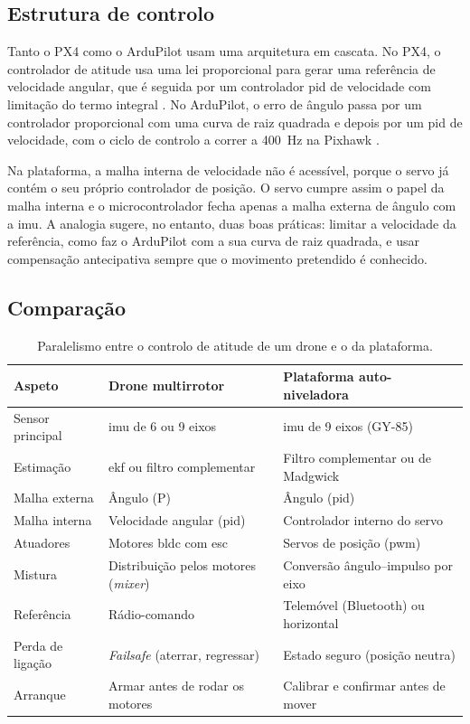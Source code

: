 \subsection{Estrutura de controlo}
Tanto o PX4 como o ArduPilot usam uma arquitetura em cascata. No PX4, o controlador de atitude usa uma lei proporcional para gerar uma referência de velocidade angular, que é seguida por um controlador \gls{pid} de velocidade com limitação do termo integral \cite{px4ctrl}. No ArduPilot, o erro de ângulo passa por um controlador proporcional com uma curva de raiz quadrada e depois por um \gls{pid} de velocidade, com o ciclo de controlo a correr a \SI{400}{\hertz} na Pixhawk \cite{ardupilotatt}.

Na plataforma, a malha interna de velocidade não é acessível, porque o servo já contém o seu próprio controlador de posição. O servo cumpre assim o papel da malha interna e o microcontrolador fecha apenas a malha externa de ângulo com a \gls{imu}. A analogia sugere, no entanto, duas boas práticas: limitar a velocidade da referência, como faz o ArduPilot com a sua curva de raiz quadrada, e usar compensação antecipativa sempre que o movimento pretendido é conhecido.

\subsection{Comparação}
\begin{table}[H]
\centering\small
\caption{Paralelismo entre o controlo de atitude de um drone e o da plataforma.}
\begin{tabularx}{\textwidth}{>{\raggedright\arraybackslash}p{2.7cm}YY}
\toprule
Aspeto & Drone multirrotor & Plataforma auto-niveladora\\\midrule
Sensor principal & \acrshort{imu} de 6 ou 9 eixos & \acrshort{imu} de 9 eixos (GY-85)\\
Estimação & \acrshort{ekf} ou filtro complementar & Filtro complementar ou de Madgwick\\
Malha externa & Ângulo (P) & Ângulo (\acrshort{pid})\\
Malha interna & Velocidade angular (\acrshort{pid}) & Controlador interno do servo\\
Atuadores & Motores \acrshort{bldc} com \acrshort{esc} & Servos de posição (\acrshort{pwm})\\
Mistura & Distribuição pelos motores (\textit{mixer}) & Conversão ângulo--impulso por eixo\\
Referência & Rádio-comando & Telemóvel (Bluetooth) ou horizontal\\
Perda de ligação & \textit{Failsafe} (aterrar, regressar) & Estado seguro (posição neutra)\\
Arranque & Armar antes de rodar os motores & Calibrar e confirmar antes de mover\\
\bottomrule
\end{tabularx}
\label{tab:drones}
\end{table}

